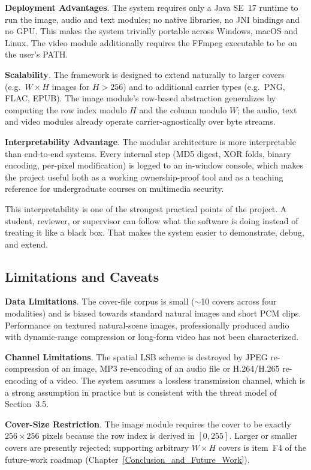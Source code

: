 \textbf{Deployment Advantages}. The system requires only a Java SE~17 runtime to run the image, audio and text modules; no native libraries, no JNI bindings and no GPU. This makes the system trivially portable across Windows, macOS and Linux. The video module additionally requires the FFmpeg executable to be on the user's PATH.

\textbf{Scalability}. The framework is designed to extend naturally to larger covers (e.g.\ $W \times H$ images for $H > 256$) and to additional carrier types (e.g.\ PNG, FLAC, EPUB). The image module's row-based abstraction generalizes by computing the row index modulo $H$ and the column modulo $W$; the audio, text and video modules already operate carrier-agnostically over byte streams.

\textbf{Interpretability Advantage}. The modular architecture is more interpretable than end-to-end systems. Every internal step (MD5 digest, XOR folds, binary encoding, per-pixel modification) is logged to an in-window console, which makes the project useful both as a working ownership-proof tool and as a teaching reference for undergraduate courses on multimedia security.

This interpretability is one of the strongest practical points of the project. A student, reviewer, or supervisor can follow what the software is doing instead of treating it like a black box. That makes the system easier to demonstrate, debug, and extend.

\subsection{Limitations and Caveats}

\textbf{Data Limitations}. The cover-file corpus is small ($\sim$10 covers across four modalities) and is biased towards standard natural images and short PCM clips. Performance on textured natural-scene images, professionally produced audio with dynamic-range compression or long-form video has not been characterized.

\textbf{Channel Limitations}. The spatial LSB scheme is destroyed by JPEG re-compression of an image, MP3 re-encoding of an audio file or H.264/H.265 re-encoding of a video. The system assumes a lossless transmission channel, which is a strong assumption in practice but is consistent with the threat model of Section~3.5.

\textbf{Cover-Size Restriction}. The image module requires the cover to be exactly $256 \times 256$ pixels because the row index is derived in $[0, 255]$. Larger or smaller covers are presently rejected; supporting arbitrary $W \times H$ covers is item~F4 of the future-work roadmap (Chapter~\ref{Conclusion_and_Future_Work}).

